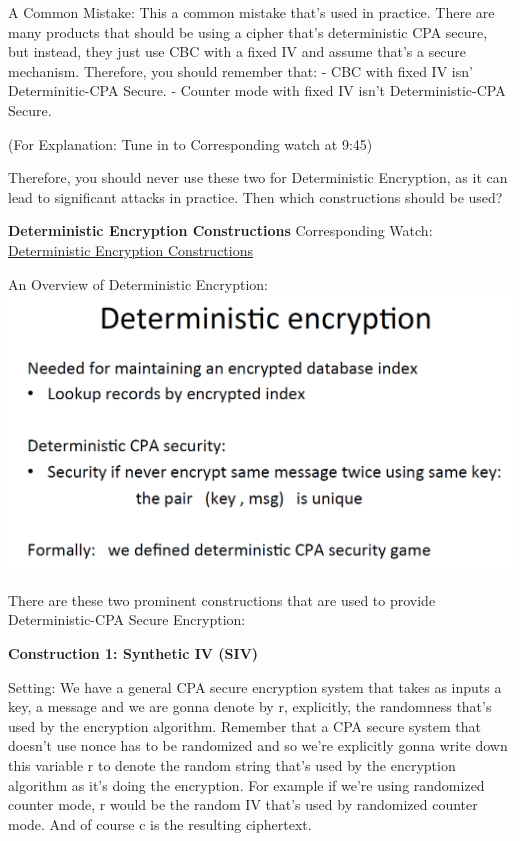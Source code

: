 \documentclass[11pt]{article}
\makeatletter
\def\maxwidth{\ifdim\Gin@nat@width>\linewidth\linewidth
    \else\Gin@nat@width\fi}
\let\Oldincludegraphics\includegraphics
\renewcommand{\includegraphics}[1]{\Oldincludegraphics[width=.8\maxwidth]{#1}}
\makeatother
\begin{document}
A Common Mistake: This a common mistake that's used in practice. There
are many products that should be using a cipher that's deterministic CPA
secure, but instead, they just use CBC with a fixed IV and assume that's
a secure mechanism. Therefore, you should remember that: - CBC with
fixed IV isn' Determinitic-CPA Secure. - Counter mode with fixed IV
isn't Deterministic-CPA Secure.

(For Explanation: Tune in to Corresponding watch at 9:45)

Therefore, you should never use these two for Deterministic Encryption,
as it can lead to significant attacks in practice. Then which
constructions should be used?

\textbf{Deterministic Encryption Constructions} Corresponding Watch:
\href{https://www.coursera.org/learn/crypto/lecture/hM7f2/deterministic-encryption-siv-and-wide-prp}{Deterministic
Encryption Constructions}

An Overview of Deterministic Encryption:
\includegraphics{./Images/DetEnc-Overview.png}

There are these two prominent constructions that are used to provide
Deterministic-CPA Secure Encryption:

\textbf{Construction 1: Synthetic IV (SIV)}

Setting: We have a general CPA secure encryption system that takes as
inputs a key, a message and we are gonna denote by r, explicitly, the
randomness that's used by the encryption algorithm. Remember that a CPA
secure system that doesn't use nonce has to be randomized and so we're
explicitly gonna write down this variable r to denote the random string
that's used by the encryption algorithm as it's doing the encryption.
For example if we're using randomized counter mode, r would be the
random IV that's used by randomized counter mode. And of course c is the
resulting ciphertext.
\end{document}
